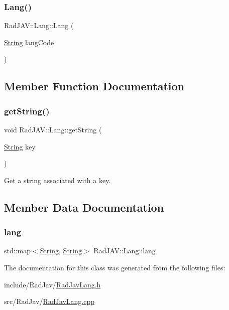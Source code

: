 \subsubsection{\texorpdfstring{Lang()}{Lang()}}
{\footnotesize\ttfamily Rad\+J\+A\+V\+::\+Lang\+::\+Lang (\begin{DoxyParamCaption}\item[{\mbox{\hyperlink{class_rad_j_a_v_1_1_string}{String}}}]{lang\+Code }\end{DoxyParamCaption})}



\subsection{Member Function Documentation}
\mbox{\label{class_rad_j_a_v_1_1_lang_a38ebc57271ef3ffc4ed6aec7854360bf}} 
\subsubsection{\texorpdfstring{get\+String()}{getString()}}
{\footnotesize\ttfamily void Rad\+J\+A\+V\+::\+Lang\+::get\+String (\begin{DoxyParamCaption}\item[{\mbox{\hyperlink{class_rad_j_a_v_1_1_string}{String}}}]{key }\end{DoxyParamCaption})}



Get a string associated with a key. 



\subsection{Member Data Documentation}
\mbox{\label{class_rad_j_a_v_1_1_lang_ae8341308089ef735fd294bbdd91c2f37}} 
\subsubsection{\texorpdfstring{lang}{lang}}
{\footnotesize\ttfamily std\+::map$<$\mbox{\hyperlink{class_rad_j_a_v_1_1_string}{String}}, \mbox{\hyperlink{class_rad_j_a_v_1_1_string}{String}}$>$ Rad\+J\+A\+V\+::\+Lang\+::lang\hspace{0.3cm}{\ttfamily [protected]}}



The documentation for this class was generated from the following files\+:\begin{DoxyCompactItemize}
\item 
include/\+Rad\+Jav/\mbox{\hyperlink{_rad_jav_lang_8h}{Rad\+Jav\+Lang.\+h}}\item 
src/\+Rad\+Jav/\mbox{\hyperlink{_rad_jav_lang_8cpp}{Rad\+Jav\+Lang.\+cpp}}\end{DoxyCompactItemize}
